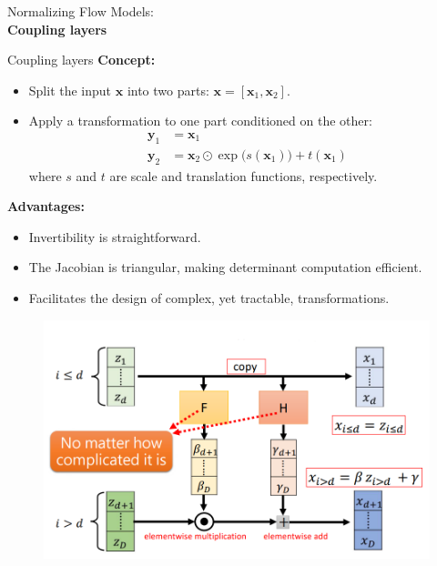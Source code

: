 \begin{frame}[allowframebreaks]{}
    \LARGE Normalizing Flow Models: \\[1.5ex] \textbf{Coupling layers}
\end{frame}

\begin{frame}[allowframebreaks]{Coupling layers}
\textbf{Concept:}

\begin{itemize}
    \item Split the input $\mathbf{x}$ into two parts: $\mathbf{x} = [\mathbf{x}_1, \mathbf{x}_2]$.
    \item Apply a transformation to one part conditioned on the other:
    \begin{align*}
        \mathbf{y}_1 &= \mathbf{x}_1 \\
        \mathbf{y}_2 &= \mathbf{x}_2 \odot \exp\big(s(\mathbf{x}_1)\big) + t(\mathbf{x}_1)
    \end{align*}
    where $s$ and $t$ are scale and translation functions, respectively.
\end{itemize}

\textbf{Advantages:}
\begin{itemize}
    \item Invertibility is straightforward.
    \item The Jacobian is triangular, making determinant computation efficient.
    \item Facilitates the design of complex, yet tractable, transformations.
\end{itemize}
\begin{figure}
    \centering
    \includegraphics[height=0.9\textheight, width=\textwidth, keepaspectratio]{images/norm-flow/coupling_layer_1.png}
\end{figure}


\end{frame}
